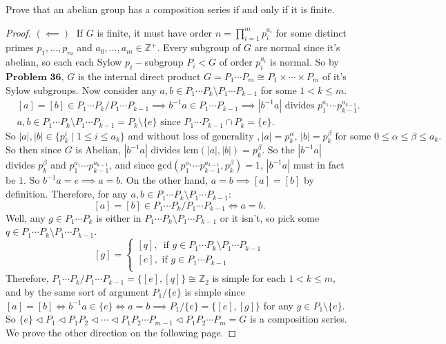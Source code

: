 \documentclass[addpoints,10pt]{exam}
\theoremstyle{plain}
\theoremstyle{definition}
\newtheorem{prob}[thm]{Problem}
\theoremstyle{plain}
\theoremstyle{plain}
\theoremstyle{definition}
\let\oldprob\prob
\let\endoldprob\endprob
\renewenvironment{prob}
  {\begin{singlespace}\oldprob}
  {\endoldprob\end{singlespace}}
\newcommand{\ZZ}{\ensuremath{\mathbb{Z}}}
\begin{document}
\setcounter{thm}{39}   %
\begin{prob}
Prove that an abelian group has a composition series if and only if it is finite.
\end{prob}

\begin{proof}
  $(\impliedby)\;$ If $G$ is finite, it must have order $n=\prod_{i=1}^{m}p_{i}^{a_{i}}$ for some distinct primes $p_{1},\hdots, p_{m}$ and $a_{0},\hdots, a_{m}\in \ZZ^{+}.$ Every subgroup of $G$ are normal since it's abelian, so each each Sylow $p_{i}-$subgroup $P_{i}<G$ of order $p_{i}^{a_{i}}$ is normal. So by $\textbf{Problem 36}$, $G$ is the internal direct product $G=P_{1}\cdots P_{m}\cong P_{1}\times \cdots \times P_{m}$ of it's Sylow subgroups. Now consider any $a,b\in P_{1}\cdots P_{k}\setminus P_{1}\cdots P_{k-1}$ for some $1< k\leq m$. 
  \begin{align*}
    &[a]=[b]\in P_{1}\cdots P_{k}/ P_{1}\cdots P_{k-1} \implies b^{-1}a\in P_{1}\cdots P_{k-1}\implies |b^{-1}a|\text{ divides }p_{1}^{a_{1}}\cdots p_{k-1}^{a_{k-1}}.\\
    &a,b\in P_{1}\cdots P_{k}\setminus P_{1}\cdots P_{k-1}=P_{k}\setminus\{e\}\text{ since }P_{1}\cdots P_{k-1}\cap P_{k}=\{e\}.
  \end{align*}
  $\text{So }|a|,|b|\in \{p_{k}^{i}\mid 1\leq i\leq a_{k}\} \text{ and without loss of generality },|a|=p_{k}^\alpha,\,|b|=p_{k}^{\beta}\text{ for some }0 \leq \alpha\leq \beta\leq a_{k}.$ So then since $G$ is Abelian, $|b^{-1}a|$ divides $\mathrm{lcm}(|a|,|b|)=p_{k}^{\beta}$. So the $|b^{-1}a|$ divides $p_{k}^{\beta}$ and $p_{1}^{a_{1}}\cdots p_{k-1}^{a_{k-1}}$, and since $\mathrm{gcd}(p_{1}^{a_{1}}\cdots p_{k-1}^{a_{k-1}},p_{k}^{\beta})=1$, $|b^{-1}a|$ must in fact be $1$. So $b^{-1}a=e\implies a=b$. On the other hand, $a=b\implies [a]=[b]$ by definition. Therefore, for any $a,b\in P_{1}\cdots P_{k}\setminus P_{1}\cdots P_{k-1}$:
    $$[a]=[b]\in P_{1}\cdots P_{k}/ P_{1}\cdots P_{k-1}\iff a=b.$$
  Well, any $g\in P_{1}\cdots P_{k}$ is either in $P_{1}\cdots P_{k}\setminus P_{1}\cdots P_{k-1}$ or it isn't, so pick some $q\in P_{1}\cdots P_{k}\setminus P_{1}\cdots P_{k-1}$.
  $$[g]=\begin{cases}[q],\,\text{ if }g\in P_{1}\cdots P_{k}\setminus P_{1}\cdots P_{k-1}\\ [e],\text{ if }g\in P_{1}\cdots P_{k-1}\\ \end{cases}$$
  Therefore, $P_{1}\cdots P_{k}/ P_{1}\cdots P_{k-1}=\{[e],[q]\}\cong \ZZ_{2}$ is simple for each $1< k\leq m$, and by the same sort of argument $P_{1}/\{e\}$ is simple since $[a]=[b]\iff b^{-1}a\in \{e\}\iff a=b\implies P_{1}/\{e\}=\{[e],[g]\}$ for any $g\in P_{1}\setminus\{e\}$. So $\{e\} \triangleleft P_{1}\triangleleft P_{1}P_{2} \triangleleft \cdots \triangleleft P_{1}P_{2} \cdots P_{m-1}\triangleleft P_{1}P_{2}\cdots P_{m}=G$ is a composition series. We prove the other direction on the following page.


\end{proof}
\end{document}
